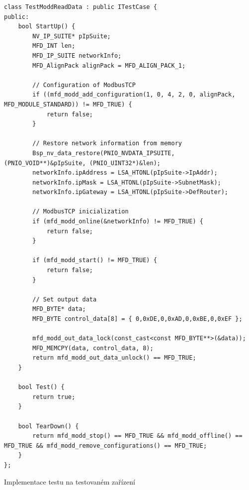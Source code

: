 \begin{listing}[p]
    \centering
    \begin{verbatim}
class TestModdReadData : public ITestCase {
public:
    bool StartUp() {
        NV_IP_SUITE* pIpSuite;
        MFD_INT len;
        MFD_IP_SUITE networkInfo;
        MFD_AlignPack alignPack = MFD_ALIGN_PACK_1;

        // Configuration of ModbusTCP
        if ((mfd_modd_add_configuration(1, 0, 4, 2, 0, alignPack, MFD_MODULE_STANDARD)) != MFD_TRUE) { 
            return false; 
        }

        // Restore network information from memory
        Bsp_nv_data_restore(PNIO_NVDATA_IPSUITE, (PNIO_VOID**)&pIpSuite, (PNIO_UINT32*)&len);
        networkInfo.ipAddress = LSA_HTONL(pIpSuite->IpAddr);
        networkInfo.ipMask = LSA_HTONL(pIpSuite->SubnetMask);
        networkInfo.ipGateway = LSA_HTONL(pIpSuite->DefRouter);

        // ModbusTCP inicialization
        if (mfd_modd_online(&networkInfo) != MFD_TRUE) {
            return false;
        }

        if (mfd_modd_start() != MFD_TRUE) {
            return false;
        }
            
        // Set output data
        MFD_BYTE* data;
        MFD_BYTE control_data[8] = { 0,0xDE,0,0xAD,0,0xBE,0,0xEF };
            
        mfd_modd_out_data_lock(const_cast<const MFD_BYTE**>(&data));
        MFD_MEMCPY(data, control_data, 8);
        return mfd_modd_out_data_unlock() == MFD_TRUE;
    }

    bool Test() {
        return true;
    }

    bool TearDown() {
        return mfd_modd_stop() == MFD_TRUE && mfd_modd_offline() == MFD_TRUE && mfd_modd_remove_configurations() == MFD_TRUE;
    }
};
    \end{verbatim}
\caption{Implementace testu na testovaném zařízení}
\label{listing:testcase_device}
\end{listing}


